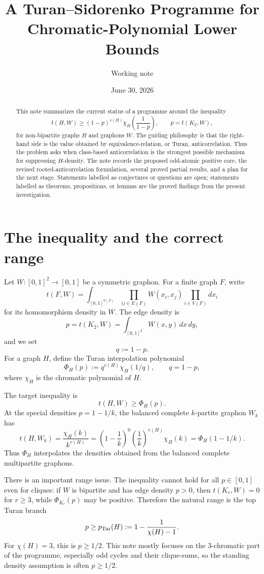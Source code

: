 \documentclass[11pt]{article}
\title{A Turan--Sidorenko Programme for Chromatic-Polynomial Lower Bounds}
\author{Working note}
\date{June 30, 2026}
\theoremstyle{definition}
\begin{document}
\maketitle

\begin{abstract}
This note summarizes the current status of a programme around the inequality
\[
  t(H,W)\ge (1-p)^{v(H)}\chi_H\!\left(\frac1{1-p}\right),
  \qquad p=t(K_2,W),
\]
for non-bipartite graphs $H$ and graphons $W$.  The guiding philosophy is that the right-hand side is the value obtained by equivalence-relation, or Turan, anticorrelation.  Thus the problem asks when class-based anticorrelation is the strongest possible mechanism for suppressing $H$-density.  The note records the proposed odd-atomic positive core, the revised rooted-anticorrelation formulation, several proved partial results, and a plan for the next stage.  Statements labelled as conjectures or questions are open; statements labelled as theorems, propositions, or lemmas are the proved findings from the present investigation.
\end{abstract}

\tableofcontents

\section{The inequality and the correct range}

Let $W:[0,1]^2\to[0,1]$ be a symmetric graphon.  For a finite graph $F$, write
\[
  t(F,W)=\int_{[0,1]^{V(F)}}\prod_{ij\in E(F)}W(x_i,x_j)\prod_{i\in V(F)}dx_i
\]
for its homomorphism density in $W$.  The edge density is
\[
  p=t(K_2,W)=\int_{[0,1]^2}W(x,y)\,dx\,dy,
\]
and we set
\[
  q:=1-p.
\]
For a graph $H$, define the Turan interpolation polynomial
\[
  \Phi_H(p):=q^{v(H)}\chi_H(1/q),
  \qquad q=1-p,
\]
where $\chi_H$ is the chromatic polynomial of $H$.

The target inequality is
\begin{equation}\label{eq:main-ineq}
  t(H,W)\ge \Phi_H(p).
\end{equation}
At the special densities $p=1-1/k$, the balanced complete $k$-partite graphon $W_k$ has
\[
  t(H,W_k)=\frac{\chi_H(k)}{k^{v(H)}}
  =\left(1-\frac1k\right)^{0}\left(\frac1k\right)^{v(H)}\chi_H(k)
  =\Phi_H(1-1/k).
\]
Thus $\Phi_H$ interpolates the densities obtained from the balanced complete multipartite graphons.

There is an important range issue.  The inequality cannot hold for all $p\in[0,1]$ even for cliques: if $W$ is bipartite and has edge density $p>0$, then $t(K_r,W)=0$ for $r\ge3$, while $\Phi_{K_r}(p)$ may be positive.  Therefore the natural range is the top Turan branch
\begin{equation}\label{eq:top-branch}
  p\ge p_{\rm Tur}(H):=1-\frac1{\chi(H)-1}.
\end{equation}
For $\chi(H)=3$, this is $p\ge1/2$.  This note mostly focuses on the $3$-chromatic part of the programme, especially odd cycles and their clique-sums, so the standing density assumption is often $p\ge1/2$.
\end{document}
